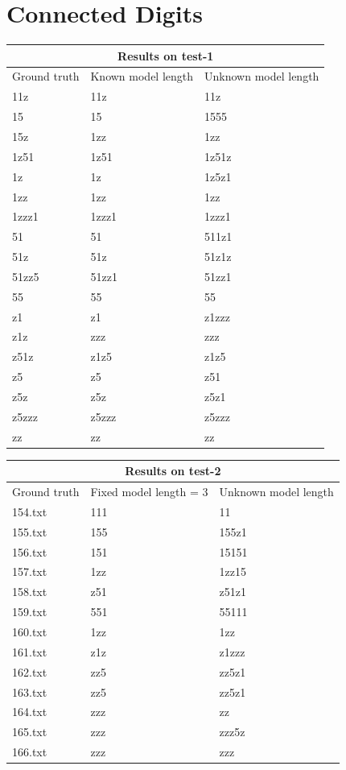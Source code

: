 \documentclass{article}
\begin{document}
\section{Connected Digits}

\begin{table}[h!]
\centering
\begin{tabular}{ |p{2.5cm}|p{2.5cm}|p{2.5cm}|  }
\hline
\multicolumn{3}{|c|}{Results on test-1} \\
\hline
Ground truth & Known model length & Unknown model length \\
\hline
11z & 11z & 11z\\
15 & 15 & 1555\\
15z & 1zz & 1zz\\
1z51 & 1z51 & 1z51z\\
1z & 1z & 1z5z1\\
1zz & 1zz & 1zz\\
1zzz1 & 1zzz1 & 1zzz1\\
51 & 51 & 511z1\\
51z & 51z & 51z1z\\
51zz5 & 51zz1 & 51zz1\\
55 & 55 & 55\\
z1 & z1 & z1zzz\\
z1z & zzz & zzz\\
z51z & z1z5 & z1z5\\
z5 & z5 & z51\\
z5z & z5z & z5z1\\
z5zzz & z5zzz & z5zzz\\
zz & zz & zz\\
\hline
\end{tabular}
\end{table}

\begin{table}[h!]
\centering
\begin{tabular}{ |p{2.5cm}|p{2.5cm}|p{2.5cm}|  }
\hline
\multicolumn{3}{|c|}{Results on test-2} \\
\hline
Ground truth & Fixed model length = 3 & Unknown model length \\
\hline
154.txt & 111 & 11\\
155.txt & 155 & 155z1\\
156.txt & 151 & 15151\\
157.txt & 1zz & 1zz15\\
158.txt & z51 & z51z1\\
159.txt & 551 & 55111\\
160.txt & 1zz & 1zz\\
161.txt & z1z & z1zzz\\
162.txt & zz5 & zz5z1\\
163.txt & zz5 & zz5z1\\
164.txt & zzz & zz\\
165.txt & zzz & zzz5z\\
166.txt & zzz & zzz\\
\hline
\end{tabular}
\end{table}
\end{document}
